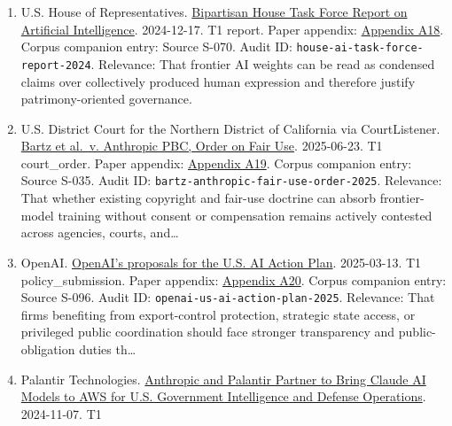\documentclass[
  american,
  11pt,
  letterpaper,
]{article}
\begin{document}
\begin{enumerate}
{  A17}. Corpus companion entry: Source S-122. Audit ID:
  \texttt{twinchat-ai-copyright-weights}. Relevance: That frontier AI
  weights can be read as condensed claims over collectively produced
  human expression and therefore justify patrimony-oriented governance.
\item
  U.S. House of Representatives.
  \href{https://www.speaker.gov/wp-content/uploads/2024/12/AI-Task-Force-Report-FINAL.pdf}{Bipartisan
  House Task Force Report on Artificial Intelligence}. 2024-12-17. T1
  report. Paper appendix:
  \hyperref[appendix-a18-bipartisan-house-task-force-report-on-artificial-intelligence]{Appendix
  A18}. Corpus companion entry: Source S-070. Audit ID:
  \texttt{house-ai-task-force-report-2024}. Relevance: That frontier AI
  weights can be read as condensed claims over collectively produced
  human expression and therefore justify patrimony-oriented governance.
\item
  U.S. District Court for the Northern District of California via
  CourtListener.
  \href{https://storage.courtlistener.com/recap/gov.uscourts.cand.434709/gov.uscourts.cand.434709.231.0_3.pdf}{Bartz
  et al.~v. Anthropic PBC, Order on Fair Use}. 2025-06-23. T1
  court\_order. Paper appendix:
  \hyperref[appendix-a19-bartz-et-al-v-anthropic-pbc-order-on-fair-use]{Appendix
  A19}. Corpus companion entry: Source S-035. Audit ID:
  \texttt{bartz-anthropic-fair-use-order-2025}. Relevance: That whether
  existing copyright and fair-use doctrine can absorb frontier-model
  training without consent or compensation remains actively contested
  across agencies, courts, and\ldots{}
\item
  OpenAI.
  \href{https://openai.com/global-affairs/openai-proposals-for-the-us-ai-action-plan/}{OpenAI's
  proposals for the U.S. AI Action Plan}. 2025-03-13. T1
  policy\_submission. Paper appendix:
  \hyperref[appendix-a20-openais-proposals-for-the-us-ai-action-plan]{Appendix
  A20}. Corpus companion entry: Source S-096. Audit ID:
  \texttt{openai-us-ai-action-plan-2025}. Relevance: That firms
  benefiting from export-control protection, strategic state access, or
  privileged public coordination should face stronger transparency and
  public-obligation duties th\ldots{}
\item
  Palantir Technologies.
  \href{https://investors.palantir.com/news-details/2024/Anthropic-and-Palantir-Partner-to-Bring-Claude-AI-Models-to-AWS-for-U.S.-Government-Intelligence-and-Defense-Operations/}{Anthropic
  and Palantir Partner to Bring Claude AI Models to AWS for U.S.
  Government Intelligence and Defense Operations}. 2024-11-07. T1

\end{enumerate}
\end{document}
